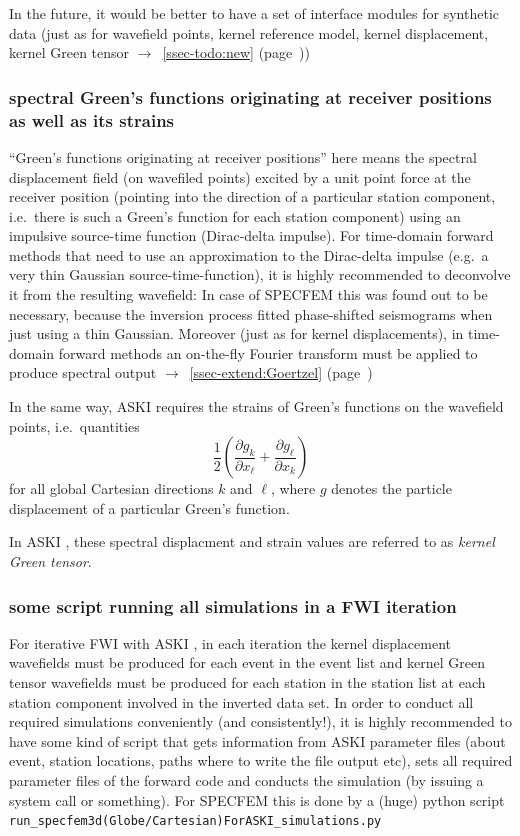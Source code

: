 \documentclass[12pt,a4paper]{article}
\newcommand{\lcode}[1]{\nolinkurl{#1}}
\newcommand{\ASKI}{ {\ttfamily ASKI} }
\newcommand{\myaref}[1]{$\rightarrow$~\ref{#1} (page~\pageref{#1})}
\begin{document}
In the future, it would be better to have a set of interface modules for synthetic data (just as
for wavefield points, kernel reference model, kernel displacement, kernel Green tensor \myaref{ssec-todo:new})

\subsubsection{spectral Green's functions originating at receiver positions as well as its strains}
``Green's functions originating at receiver positions'' here means the spectral displacement field 
(on wavefiled points) excited by a
unit point force at the receiver position (pointing into the direction of a particular station component, i.e.\
there is such a Green's function for each station component) using an impulsive source-time function (Dirac-delta
impulse). For time-domain forward methods that need to use an approximation to the Dirac-delta impulse (e.g.\ a
very thin Gaussian source-time-function), it is highly recommended to deconvolve it from the resulting wavefield:
In case of SPECFEM this was found out to be necessary, because the inversion process fitted phase-shifted 
seismograms when just using a thin Gaussian. Moreover (just as for kernel displacements), in time-domain
forward methods an on-the-fly Fourier transform must be applied to produce spectral output 
\myaref{ssec-extend:Goertzel}

In the same way, \ASKI{} requires the strains of Green's functions on the wavefield points, i.e.\ quantities
\[
\frac{1}{2}\left(\frac{\partial g_k}{\partial x_\ell} + \frac{\partial g_\ell}{\partial x_k}\right)
\]
for all global Cartesian directions $k$ and $\ell$, where $g$ denotes the particle displacement of a particular
Green's function.

In \ASKI{}, these spectral displacment and strain values are referred to as \emph{kernel Green tensor}.

\subsubsection{some script running all simulations in a FWI iteration}
For iterative FWI with \ASKI{}, in each iteration the kernel displacement wavefields must be produced for each
event in the event list and kernel Green tensor wavefields must be produced for each station in the station list
at each station component involved in the inverted data set. In order to conduct all required simulations 
conveniently (and consistently!), it is highly recommended to have some kind of script that gets information
from \ASKI{} parameter files (about event, station locations, paths where to write the file output etc), 
sets all required parameter files of the forward code and conducts the simulation (by issuing a system call
or something). For SPECFEM this is done by a (huge) python script 
\lcode{run_specfem3d(Globe/Cartesian)ForASKI_simulations.py}
\end{document}
